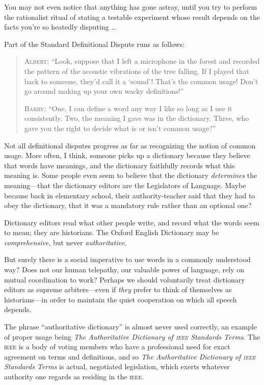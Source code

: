 {
 You may not even notice that anything has gone astray, until you
try to perform the rationalist ritual of stating a testable experiment
whose result depends on the facts you're so heatedly
disputing \ldots}

\myendsectiontext


{
 Part of the Standard Definitional Dispute runs as follows:}

\begin{quotation}
{
 \textsc{Albert}: ``Look, suppose that I left a microphone
in the forest and recorded the pattern of the acoustic vibrations of
the tree falling. If I played that back to someone,
they'd call it a
`sound'! That's the
common usage! Don't go around making up your own wacky
definitions!''}

{
 \textsc{Barry}: ``One, I can define a word any way I like
so long as I use it consistently. Two, the meaning I gave was in the
dictionary. Three, who gave you the right to decide what is or
isn't common usage?''}
\end{quotation}

{
 Not all definitional disputes progress as far as recognizing the
notion of common usage. More often, I think, someone picks up a
dictionary because they believe that words have meanings, and the
dictionary faithfully records what this meaning is. Some people even
seem to believe that the dictionary \textit{determines} the
meaning---that the dictionary editors are the Legislators of Language.
Maybe because back in elementary school, their authority-teacher said
that they had to obey the dictionary, that it was a mandatory rule
rather than an optional one?}

{
 Dictionary editors read what other people write, and record what
the words seem to mean; they are historians. The Oxford English
Dictionary may be \textit{comprehensive}, but never
\textit{authoritative.}}

{
 But surely there is a social imperative to use words in a commonly
understood way? Does not our human telepathy, our valuable power of
language, rely on mutual coordination to work? Perhaps we should
voluntarily treat dictionary editors as supreme arbiters---even if
\textit{they} prefer to think of themselves as historians---in order to
maintain the quiet cooperation on which all speech depends.}

{
 The phrase ``authoritative
dictionary'' is almost never used correctly, an
example of proper usage being \textit{The Authoritative Dictionary of
\textsc{ieee} Standards Terms}. The \textsc{ieee} is a body of voting members who have a
professional need for exact agreement on terms and definitions, and so
\textit{The Authoritative Dictionary of \textsc{ieee} Standards Terms} is
actual, negotiated legislation, which exerts whatever authority one
regards as residing in the \textsc{ieee}.}

